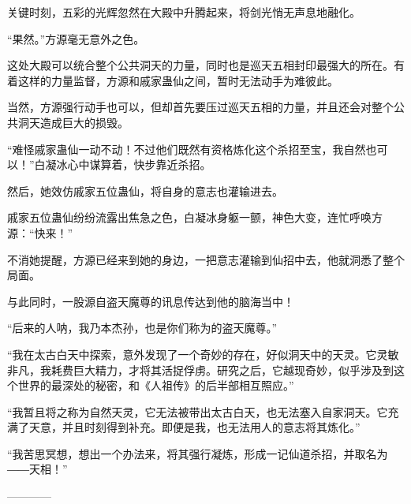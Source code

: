 \begin{this_body}
关键时刻，五彩的光辉忽然在大殿中升腾起来，将剑光悄无声息地融化。

“果然。”方源毫无意外之色。

这处大殿可以统合整个公共洞天的力量，同时也是巡天五相封印最强大的所在。有着这样的力量监督，方源和戚家蛊仙之间，暂时无法动手为难彼此。

当然，方源强行动手也可以，但却首先要压过巡天五相的力量，并且还会对整个公共洞天造成巨大的损毁。

“难怪戚家蛊仙一动不动！不过他们既然有资格炼化这个杀招至宝，我自然也可以！”白凝冰心中谋算着，快步靠近杀招。

然后，她效仿戚家五位蛊仙，将自身的意志也灌输进去。

戚家五位蛊仙纷纷流露出焦急之色，白凝冰身躯一颤，神色大变，连忙呼唤方源：“快来！”

不消她提醒，方源已经来到她的身边，一把意志灌输到仙招中去，他就洞悉了整个局面。

与此同时，一股源自盗天魔尊的讯息传达到他的脑海当中！

“后来的人呐，我乃本杰孙，也是你们称为的盗天魔尊。”

“我在太古白天中探索，意外发现了一个奇妙的存在，好似洞天中的天灵。它灵敏非凡，我耗费巨大精力，才将其活捉俘虏。研究之后，它越现奇妙，似乎涉及到这个世界的最深处的秘密，和《人祖传》的后半部相互照应。”

“我暂且将之称为自然天灵，它无法被带出太古白天，也无法塞入自家洞天。它充满了天意，并且时刻得到补充。即便是我，也无法用人的意志将其炼化。”

“我苦思冥想，想出一个办法来，将其强行凝炼，形成一记仙道杀招，并取名为――天相！”

------------

\end{this_body}

